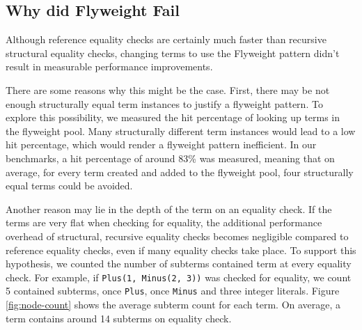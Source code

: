 \documentclass[11pt]{article}
\begin{document}



    \subsection{Why did Flyweight Fail}

    Although reference equality checks are certainly much faster than recursive structural equality
    checks, changing terms to use the Flyweight pattern didn't result in measurable performance improvements.

    There are some reasons why this might be the case. First, there may be not enough structurally
    equal term instances to justify
    a flyweight pattern. To explore this possibility, we measured the hit percentage
    of looking up terms in the flyweight pool. Many structurally different term instances would lead to
    a low hit percentage, which would render a flyweight pattern inefficient. In our
    benchmarks, a hit percentage of around 83\% was measured, meaning that on average,
    for every term created and added to the flyweight pool, four structurally equal terms could be avoided.

    Another reason may lie in the depth of the term on an equality check. If
    the terms are very flat when checking for equality, the additional performance overhead of structural, recursive equality checks becomes negligible compared to reference equality checks, even
    if many equality checks take place. To support this hypothesis, we counted the number of subterms
    contained term at every equality check. For example, if \texttt{Plus(1, Minus(2, 3))} was checked for equality,
    we count 5 contained subterms, once \texttt{Plus}, once \texttt{Minus} and three integer literals.
    Figure \ref{fig:node-count} shows the average subterm count for each term. On average,
    a term contains around 14 subterms on equality check.
\end{document}
